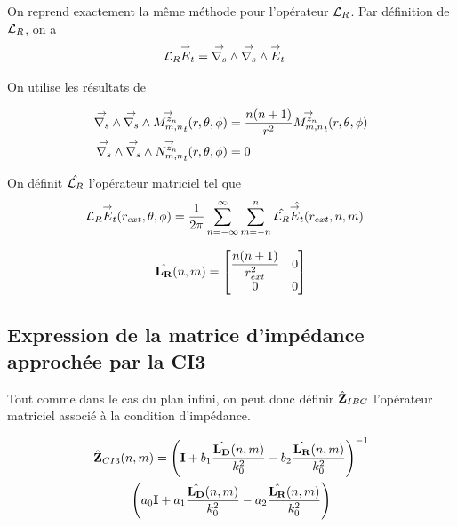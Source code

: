     On reprend exactement la même méthode pour l'opérateur \(\LR\).
    Par définition de \(\LR\), on a
    \begin{align}
      \LR \vE_t & = \vrots{} \vrots{} \vE_t
    \end{align}

    On utilise les résultats de \cite{marceaux_high-order_2000}

    \begin{align*}
      \vrots{}\vrots{} \Mmn[z_n]_t(r,\theta,\phi) &= \frac{n(n+1)}{r^2}\Mmn[z_n]_t(r,\theta,\phi)
      \\
      \vrots{}\vrots{} \Nmn[z_n]_t(r,\theta,\phi) &= 0
    \end{align*}

    On définit \(\hat{\LR}\) l'opérateur matriciel tel que
    \begin{align}
      \LR \vE_t(r_{ext},\theta,\phi)
      &= \frac{1}{2\pi}\sum_{n=-\infty}^\infty\sum_{m=-n}^n \hat{\LR} \hat{\vE_t}(r_{ext},n,m)
    \end{align}

    \begin{equation}
      \hat{\mLR}(n,m) =
      \begin{bmatrix}
        \frac{n(n+1)}{r_{ext}^2} & 0
        \\
        0 & 0
      \end{bmatrix}
    \end{equation}

  \subsection{Expression de la matrice d'impédance approchée par la CI3}

    Tout comme dans le cas du plan infini, on peut donc définir \(\hat{\mZ}_{IBC}\) l’opérateur matriciel associé à la condition d'impédance.

    \begin{multline}
        \hat{\mZ}_{CI3}(n,m) = \left(\mI + b_1 \frac{\hat{\mLD}(n,m)}{k_0^2} - b_2 \frac{\hat{\mLR}(n,m)}{k_0^2} \right)^{-1}\\
        \left(a_0 \mI + a_1 \frac{\hat{\mLD}(n,m)}{k_0^2} - a_2 \frac{\hat{\mLR}(n,m)}{k_0^2}\right)
    \end{multline}
